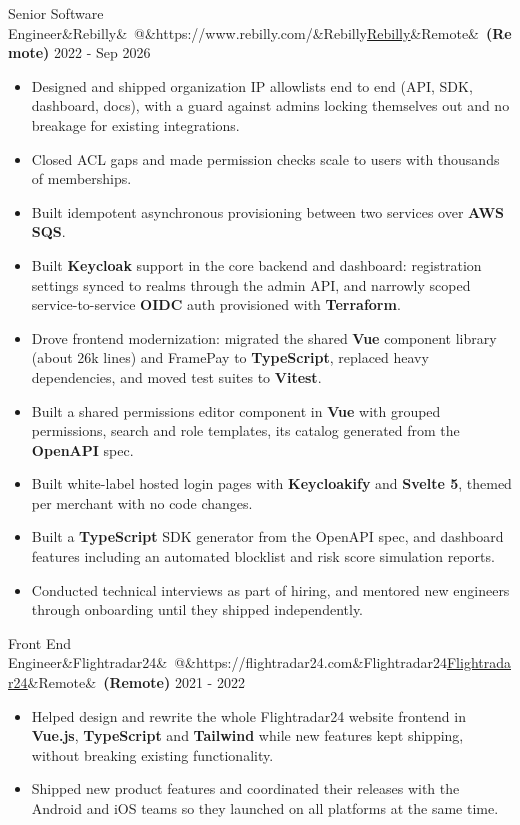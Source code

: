 \documentclass[10pt]{article}
\makeatletter
\newcommand{\weblink}[2]{\href{#1}{\textcolor{linkblue}{\underline{#2}}}}
\newcommand{\role}[5]{%
  \vspace{5pt}\par\noindent
  {\normalsize #1\ifx&#2&\else\ @\ifx&#3&#2\else\weblink{#3}{#2}\fi\fi\ifx&#4&\else\ \textbf{(#4)}\fi}%
  \hfill{\footnotesize #5}\par\nopagebreak\vspace{1pt}}
\makeatother
\begin{document}
\role{Senior Software Engineer}{Rebilly}{https://www.rebilly.com/}{Remote}{2022 - Sep 2026}
\begin{itemize}
  \item Designed and shipped organization IP allowlists end to end (API, SDK, dashboard, docs), with a guard against admins locking themselves out and no breakage for existing integrations.
  \item Closed ACL gaps and made permission checks scale to users with thousands of memberships.
  \item Built idempotent asynchronous provisioning between two services over \textbf{AWS SQS}.
  \item Built \textbf{Keycloak} support in the core backend and dashboard: registration settings synced to realms through the admin API, and narrowly scoped service-to-service \textbf{OIDC} auth provisioned with \textbf{Terraform}.
  \item Drove frontend modernization: migrated the shared \textbf{Vue} component library (about 26k lines) and FramePay to \textbf{TypeScript}, replaced heavy dependencies, and moved test suites to \textbf{Vitest}.
  \item Built a shared permissions editor component in \textbf{Vue} with grouped permissions, search and role templates, its catalog generated from the \textbf{OpenAPI} spec.
  \item Built white-label hosted login pages with \textbf{Keycloakify} and \textbf{Svelte 5}, themed per merchant with no code changes.
  \item Built a \textbf{TypeScript} SDK generator from the OpenAPI spec, and dashboard features including an automated blocklist and risk score simulation reports.
  \item Conducted technical interviews as part of hiring, and mentored new engineers through onboarding until they shipped independently.
\end{itemize}

\role{Front End Engineer}{Flightradar24}{https://flightradar24.com}{Remote}{2021 - 2022}
\begin{itemize}
  \item Helped design and rewrite the whole Flightradar24 website frontend in \textbf{Vue.js}, \textbf{TypeScript} and \textbf{Tailwind} while new features kept shipping, without breaking existing functionality.
  \item Shipped new product features and coordinated their releases with the Android and iOS teams so they launched on all platforms at the same time.
\end{itemize}
\end{document}
